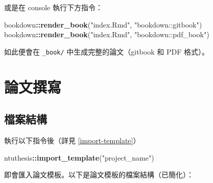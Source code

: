\documentclass[oneside]{book}
\newenvironment{Shaded}{\begin{snugshade}}{\end{snugshade}}
\newcommand{\KeywordTok}[1]{\textcolor[rgb]{0.13,0.29,0.53}{\textbf{#1}}}
\newcommand{\StringTok}[1]{\textcolor[rgb]{0.31,0.60,0.02}{#1}}
\newcommand{\OperatorTok}[1]{\textcolor[rgb]{0.81,0.36,0.00}{\textbf{#1}}}
\newcommand{\NormalTok}[1]{#1}
\theoremstyle{definition}
\theoremstyle{definition}
\theoremstyle{definition}
\theoremstyle{remark}
\begin{document}
或是在 console 執行下方指令：

\begin{Shaded}
\begin{Highlighting}[]
\NormalTok{bookdown}\OperatorTok{::}\KeywordTok{render_book}\NormalTok{(}\StringTok{"index.Rmd"}\NormalTok{, }\StringTok{"bookdown::gitbook"}\NormalTok{)}
\NormalTok{bookdown}\OperatorTok{::}\KeywordTok{render_book}\NormalTok{(}\StringTok{"index.Rmd"}\NormalTok{, }\StringTok{"bookdown::pdf_book"}\NormalTok{)}
\end{Highlighting}
\end{Shaded}

如此便會在 \texttt{\_book/} 中生成完整的論文（gitbook 和 PDF 格式）。

\chapter{論文撰寫}\label{write-thesis}

\section{檔案結構}\label{dir-structure}

執行以下指令後（詳見 \ref{import-template}）

\begin{Shaded}
\begin{Highlighting}[]
\NormalTok{ntuthesis}\OperatorTok{::}\KeywordTok{import_template}\NormalTok{(}\StringTok{"project_name"}\NormalTok{)}
\end{Highlighting}
\end{Shaded}

即會匯入論文模板。以下是論文模板的檔案結構（已簡化）：
\end{document}
